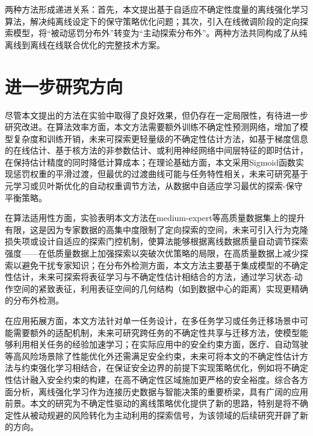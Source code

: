 两种方法形成递进关系：首先，本文提出基于自适应不确定性度量的离线强化学习算法，解决纯离线设定下的保守策略优化问题；其次，引入在线微调阶段的定向探索模型，将“被动惩罚分布外”转变为“主动探索分布外”。两种方法共同构成了从纯离线到离线在线联合优化的完整技术方案。


\section{进一步研究方向}\label{Sec5.2}

尽管本文提出的方法在实验中取得了良好效果，但仍存在一定局限性，有待进一步研究改进。在算法效率方面，本文方法需要额外训练不确定性预测网络，增加了模型复杂度和训练开销，未来可探索更轻量级的不确定性估计方法，如基于梯度信息的在线估计、基于核方法的非参数估计、或利用神经网络中间层特征的即时估计，在保持估计精度的同时降低计算成本；在理论基础方面，本文采用Sigmoid函数实现惩罚权重的平滑过渡，但最优的过渡曲线可能与任务特性相关，未来可研究基于元学习或贝叶斯优化的自动权重调节方法，从数据中自适应学习最优的探索-保守平衡策略。

在算法适用性方面，实验表明本文方法在medium-expert等高质量数据集上的提升有限，这是因为专家数据的高集中度限制了定向探索的空间，未来可引入行为克隆损失项或设计自适应的探索门控机制，使算法能够根据离线数据质量自动调节探索强度——在低质量数据上加强探索以突破次优策略的局限，在高质量数据上减少探索以避免干扰专家知识；在分布外检测方面，本文方法主要基于集成模型的不确定性估计，未来可探索将表征学习与不确定性估计相结合的方法，通过学习状态-动作空间的紧致表征，利用表征空间的几何结构（如到数据中心的距离）实现更精确的分布外检测。

在应用拓展方面，本文方法针对单一任务设计，在多任务学习或任务迁移场景中可能需要额外的适配机制，未来可研究跨任务的不确定性共享与迁移方法，使模型能够利用相关任务的经验加速学习；在实际应用中的安全约束方面，医疗、自动驾驶等高风险场景除了性能优化外还需满足安全约束，未来可将本文的不确定性估计方法与约束强化学习相结合，在保证安全边界的前提下实现策略优化，例如将不确定性估计融入安全约束的构建，在高不确定性区域施加更严格的安全裕度。综合各方面分析，离线强化学习作为连接历史数据与智能决策的重要桥梁，具有广阔的应用前景。本文的研究为不确定性驱动的离线策略优化提供了新的思路，特别是将不确定性从被动规避的风险转化为主动利用的探索信号，为该领域的后续研究开辟了新的方向。

